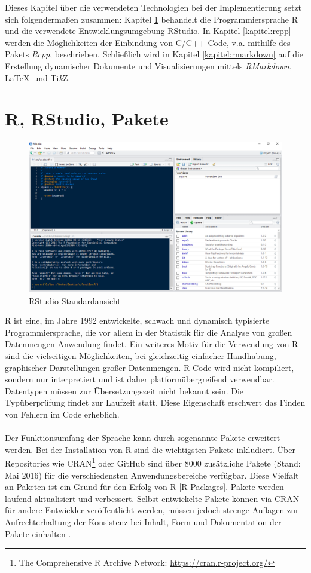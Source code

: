 Dieses Kapitel über die verwendeten Technologien bei der Implementierung setzt sich folgendermaßen zusammen: Kapitel \ref{kapitel:R} behandelt die Programmiersprache R und die verwendete Entwicklungsumgebung RStudio. In Kapitel \ref{kapitel:rcpp} werden die Möglichkeiten der Einbindung von C/C++ Code, v.a. mithilfe des Pakets \emph{Rcpp}, beschrieben. Schließlich wird in Kapitel \ref{kapitel:rmarkdown} auf die Erstellung dynamischer Dokumente und Visualisierungen mittels \emph{RMarkdown}, \LaTeX\ und Ti\textit{k}Z.
\section{R, RStudio, Pakete}
\label{kapitel:R}
\begin{figure}[!t]
\centering
\includegraphics[width=\textwidth]{abbildungen/rstudio}
\caption{RStudio Standardansicht}
\label{abb:rstudio}
\end{figure}
R ist eine, im Jahre 1992 entwickelte, schwach und dynamisch typisierte Programmiersprache, die vor allem in der Statistik für die Analyse von großen Datenmengen Anwendung findet. Ein weiteres Motiv für die Verwendung von R sind die vielseitigen Möglichkeiten, bei gleichzeitig einfacher Handhabung, graphischer Darstellungen großer Datenmengen. R-Code wird nicht kompiliert, sondern nur interpretiert und ist daher platformübergreifend verwendbar. Datentypen müssen zur Übersetzungszeit nicht bekannt sein. Die Typüberprüfung findet zur Laufzeit statt. Diese Eigenschaft erschwert das Finden von Fehlern im Code erheblich.
\\
\\
Der Funktionsumfang der Sprache kann durch sogenannte Pakete erweitert werden. Bei der Installation von R sind die wichtigsten Pakete inkludiert. Über Repositories wie CRAN\footnote{The Comprehensive R Archive Network: \url{https://cran.r-project.org/}} oder GitHub sind über 8000 zusätzliche Pakete (Stand: Mai 2016) für die verschiedensten Anwendungsbereiche verfügbar. Diese Vielfalt an Paketen ist ein Grund für den Erfolg von R [R Packages]. Pakete werden laufend aktualisiert und verbessert. Selbst entwickelte Pakete können via CRAN für andere Entwickler veröffentlicht werden, müssen jedoch strenge Auflagen zur Aufrechterhaltung der Konsistenz bei Inhalt, Form und Dokumentation der Pakete einhalten \cite{rmanual}.  
